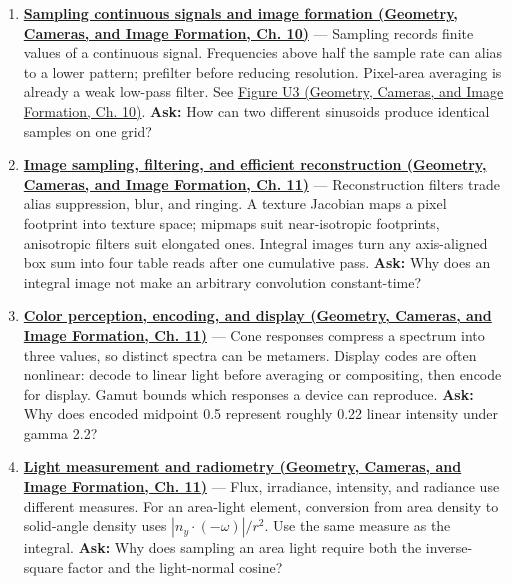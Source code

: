 \begin{enumerate}
\item
  \textbf{\href{../03-Geometry-Cameras-and-Image-Formation/main.pdf\#nameddest=03-visual-computing-i-ch003-sampling-continuous-signals-and-image-formation}{Sampling continuous signals and image formation (Geometry, Cameras, and Image Formation, Ch. 10)}} --- Sampling records finite values of a continuous signal. Frequencies above half the sample rate can alias to a lower pattern; prefilter before reducing resolution. Pixel-area averaging is already a weak low-pass filter. See \href{../03-Geometry-Cameras-and-Image-Formation/main.pdf\#nameddest=03-visual-computing-i-ch003-figure-u3---two-signals-can-share-the-same-samples}{Figure U3 (Geometry, Cameras, and Image Formation, Ch. 10)}. \textbf{Ask:} How can two different sinusoids produce identical samples on one grid?
\item
  \textbf{\href{../03-Geometry-Cameras-and-Image-Formation/main.pdf\#nameddest=03-visual-computing-i-ch004-image-sampling-filtering-and-efficient-reconstruction}{Image sampling, filtering, and efficient reconstruction (Geometry, Cameras, and Image Formation, Ch. 11)}} --- Reconstruction filters trade alias suppression, blur, and ringing. A texture Jacobian maps a pixel footprint into texture space; mipmaps suit near-isotropic footprints, anisotropic filters suit elongated ones. Integral images turn any axis-aligned box sum into four table reads after one cumulative pass. \textbf{Ask:} Why does an integral image not make an arbitrary convolution constant-time?
\item
  \textbf{\href{../03-Geometry-Cameras-and-Image-Formation/main.pdf\#nameddest=03-visual-computing-i-ch004-color-perception-encoding-and-display}{Color perception, encoding, and display (Geometry, Cameras, and Image Formation, Ch. 11)}} --- Cone responses compress a spectrum into three values, so distinct spectra can be metamers. Display codes are often nonlinear: decode to linear light before averaging or compositing, then encode for display. Gamut bounds which responses a device can reproduce. \textbf{Ask:} Why does encoded midpoint 0.5 represent roughly 0.22 linear intensity under gamma 2.2?
\item
  \textbf{\href{../03-Geometry-Cameras-and-Image-Formation/main.pdf\#nameddest=03-visual-computing-i-ch004-light-measurement-and-radiometry}{Light measurement and radiometry (Geometry, Cameras, and Image Formation, Ch. 11)}} --- Flux, irradiance, intensity, and radiance use different measures. For an area-light element, conversion from area density to solid-angle density uses \(|n_y\cdot(-\omega)|/r^2\). Use the same measure as the integral. \textbf{Ask:} Why does sampling an area light require both the inverse-square factor and the light-normal cosine?

\end{enumerate}
